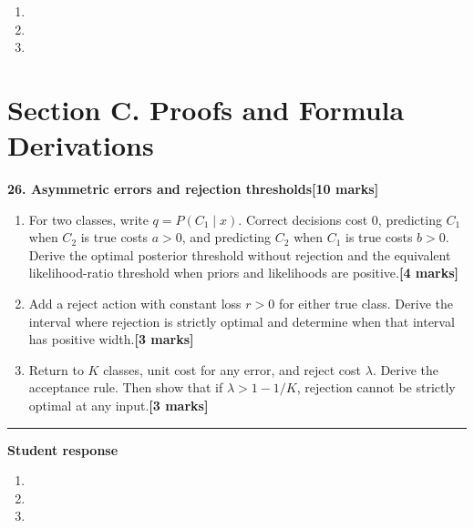 \documentclass[11pt,a4paper]{article}
\newlength{\BlankAnswerHeight}\setlength{\BlankAnswerHeight}{16mm}
\newcommand{\AnswerBlank}{\leavevmode\par\vspace{\BlankAnswerHeight}}
\begin{document}
\begin{enumerate}[label=(\alph*),leftmargin=8mm,itemsep=3pt]
\item
\AnswerBlank
\item
\AnswerBlank
\item
\AnswerBlank
\end{enumerate}
\newpage\section*{Section C. Proofs and Formula Derivations}
\textbf{26. Asymmetric errors and rejection thresholds}\hfill\textbf{[10 marks]}\par\medskip
\begin{enumerate}[label=(\alph*),leftmargin=8mm,itemsep=3pt]
\item For two classes, write \(q=P(C_1\mid x)\). Correct decisions cost 0, predicting \(C_1\) when \(C_2\) is true costs \(a>0\), and predicting \(C_2\) when \(C_1\) is true costs \(b>0\). Derive the optimal posterior threshold without rejection and the equivalent likelihood-ratio threshold when priors and likelihoods are positive.\hfill\textbf{[4 marks]}
\item Add a reject action with constant loss \(r>0\) for either true class. Derive the interval where rejection is strictly optimal and determine when that interval has positive width.\hfill\textbf{[3 marks]}
\item Return to \(K\) classes, unit cost for any error, and reject cost \(\lambda\). Derive the acceptance rule. Then show that if \(\lambda>1-1/K\), rejection cannot be strictly optimal at any input.\hfill\textbf{[3 marks]}
\end{enumerate}\par\medskip\hrule\medskip\textbf{Student response}\par
\begin{enumerate}[label=(\alph*),leftmargin=8mm,itemsep=3pt]
\item
\AnswerBlank
\item
\AnswerBlank
\item
\AnswerBlank
\end{enumerate}
\end{document}
